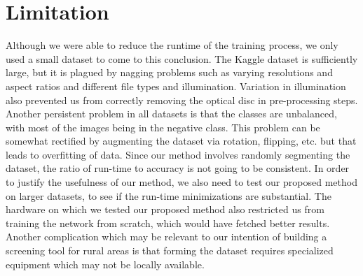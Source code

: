 \documentclass[12pt]{report}
\begin{document}
\section{Limitation}
Although we were able to reduce the runtime of the training process, we only used a small dataset to come to this conclusion. The Kaggle dataset is sufficiently large, but it is plagued by nagging problems such as varying resolutions and aspect ratios and different file types and illumination. Variation in illumination also prevented us from correctly removing the optical disc in pre-processing steps. Another persistent problem in all datasets is that the classes are unbalanced, with most of the images being in the negative class. This problem can be somewhat rectified by augmenting the dataset via rotation, flipping, etc. but that leads to overfitting of data. Since our method involves randomly segmenting the dataset, the ratio of run-time to accuracy is not going to be consistent. In order to justify the usefulness of our method, we also need to test our proposed method on larger datasets, to see if the run-time minimizations are substantial. The hardware on which we tested our proposed method also restricted us from training the network from scratch, which would have fetched better results. Another complication which may be relevant to our intention of building a screening tool for rural areas is that forming the dataset requires specialized equipment which may not be locally available.
\end{document}
